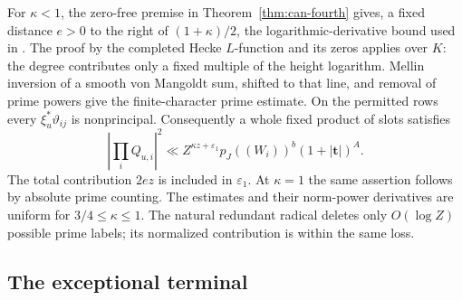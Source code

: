 \documentclass[11pt,a4paper]{article}
\numberwithin{equation}{section}
\theoremstyle{definition}
\theoremstyle{remark}
\newcommand{\eps}{\varepsilon}
\begin{document}
For $\kappa<1$, the zero-free premise in
Theorem~\ref{thm:can-fourth} gives, a fixed distance $e>0$ to the
right of $(1+\kappa)/2$, the logarithmic-derivative bound used in
\cite[(18.11)]{Q}.  The proof by the completed Hecke $L$-function
and its zeros applies over $K$: the degree contributes only a
fixed multiple of the height logarithm.  Mellin inversion of a
smooth von Mangoldt sum, shifted to that line, and removal of
prime powers give the finite-character prime estimate.  On the
permitted rows every $\xi_u^*\vartheta_{ij}$ is nonprincipal.
Consequently a whole fixed product of slots satisfies
\begin{equation}\label{eq:can-prime-bound}
 \left|\prod_iQ_{u,i}\right|^2
 \ll Z^{\kappa z+\eps_1}
       p_J((W_i))^b(1+|\boldsymbol t|)^A.
\end{equation}
The total contribution $2ez$ is included in $\eps_1$.  At $\kappa=1$ the same assertion follows
by absolute prime counting.  The estimates and their norm-power
derivatives are uniform for $3/4\le\kappa\le1$.
The natural redundant radical deletes only $O(\log Z)$ possible
prime labels; its normalized contribution is within the same loss.

\subsection{The exceptional terminal}
\end{document}
